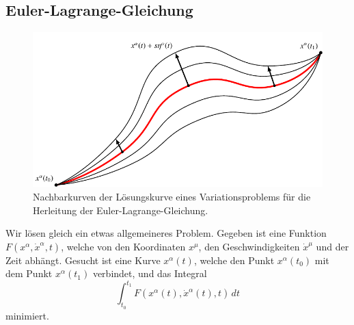 \subsection{Euler-Lagrange-Gleichung}
\begin{figure}
\includegraphics{chapters/tikz/lagrange.pdf}
\caption{Nachbarkurven der Lösungskurve eines Variationsproblems
für die Herleitung der Euler-Lagrange-Gleichung.
\label{skript:geodaeten:fig:lagrange}}
\end{figure}
Wir lösen gleich ein etwas allgemeineres Problem.
Gegeben ist eine Funktion $F(x^\alpha, \dot x^\alpha, t)$, welche
von den Koordinaten $x^\mu$, den Geschwindigkeiten $\dot x^\mu$ und
der Zeit abhängt.
Gesucht ist eine Kurve $x^\alpha(t)$, welche 
den Punkt $x^\alpha(t_0)$ mit dem Punkt $x^\alpha(t_1)$ verbindet,
und das Integral
\begin{equation}
\int_{t_0}^{t_1} F(x^\alpha(t), \dot x^\alpha(t), t)\,dt
\label{skript:variation:funktional}
\end{equation}
minimiert.

